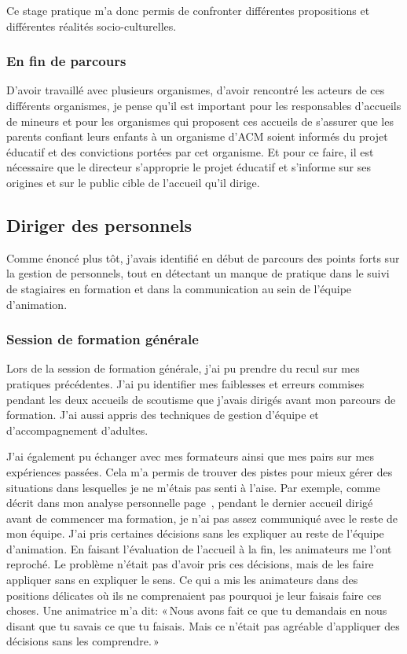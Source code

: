 \documentclass[titlepage,11pt,a4paper]{article}
\begin{document}
Ce stage pratique m'a donc permis de confronter différentes propositions et différentes
réalités socio-culturelles.

\subsubsection{En fin de parcours}

D'avoir travaillé avec plusieurs organismes, d'avoir rencontré les acteurs de ces
différents organismes, je pense qu'il est important pour les responsables d'accueils de
mineurs et pour les organismes qui proposent ces accueils de s'assurer que les parents
confiant leurs enfants à un organisme d’ACM soient informés du projet éducatif et des
convictions portées par cet organisme. Et pour ce faire, il est nécessaire que le
directeur s'approprie le projet éducatif et s'informe sur ses origines et sur le public cible de
l'accueil qu'il dirige.

\subsection{Diriger des personnels}

Comme énoncé plus tôt, j'avais identifié en début de parcours des points forts sur la
gestion de personnels, tout en détectant un manque de pratique dans le suivi de stagiaires
en formation et dans la communication au sein de l'équipe d'animation.

\subsubsection{Session de formation générale}

Lors de la session de formation générale, j'ai pu prendre du recul sur mes pratiques
précédentes. J'ai pu identifier mes faiblesses et erreurs commises pendant les deux
accueils de scoutisme que j'avais dirigés avant mon parcours de formation. J'ai aussi
appris des techniques de gestion d'équipe et d'accompagnement d'adultes.

J'ai également pu échanger avec mes formateurs ainsi que mes pairs sur mes expériences
passées. Cela m'a permis de trouver des pistes pour mieux gérer des situations dans lesquelles
je ne m'étais pas senti à l'aise. Par exemple, comme décrit dans mon analyse personnelle
page~\pageref{analysepersonnelle}, pendant le dernier accueil dirigé avant de commencer
ma formation, je n'ai pas assez
communiqué avec le reste de mon équipe. J'ai pris certaines décisions sans les expliquer
au reste de l'équipe d'animation. En faisant l'évaluation de l'accueil à la fin, les
animateurs me l'ont reproché. Le problème n'était pas d'avoir pris ces décisions, mais de
les faire appliquer sans en expliquer le sens. Ce qui a mis les animateurs dans des
positions délicates où ils ne comprenaient pas pourquoi je leur faisais faire ces choses.
Une animatrice m'a dit: «\,Nous avons fait ce que tu demandais en nous disant que tu
savais ce que tu faisais. Mais ce n'était pas agréable d'appliquer des décisions sans les
comprendre.\,»
\end{document}

